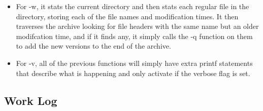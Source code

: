 \documentclass[letterpaper,10pt,fleqn]{article}
\numberwithin{equation}{section}
\begin{document}
\begin{itemize}
        \item For -w, it stats the current directory and then stats each regular file in the directory, storing each of the file names and modification times.  It then traverses the archive looking for file headers with the same name but an older modifcation time, and if it finds any, it simply calls the -q function on them to add the new versions to the end of the archive.
        \item For -v, all of the previous functions will simply have extra printf statements that describe what is happening and only activate if the verbose flag is set.
\end{itemize}

\subsection*{Work Log}
\end{document}
